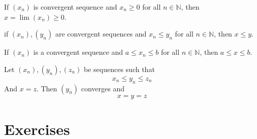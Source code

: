 \begin{theorem}
    If $(x_n)$ is convergent sequence and $x_n \ge 0$ for all $n \in \mathbb{N}$, then $x = \lim(x_n) \ge 0$.
\end{theorem}
\begin{theorem}
    if $(x_n),(y_n)$ are convergent sequences and $x_n \le y_n$ for all $n \in \mathbb{N}$, then $x \le y$.
\end{theorem}
\begin{theorem}
If $(x_n)$ is a convergent sequence and $a \le x_n \le b$ for all $n \in \mathbb{N}$, then $a \le x \le b$.
\end{theorem}
\begin{theorem}
    Let $(x_n),(y_n),(z_n)$ be sequences such that
    \[ x_n \le y_n \le z_n\]
    And $x = z$. Then $(y_n)$ converges and
    \[ x = y = z\]
\end{theorem}

\section{Exercises}
